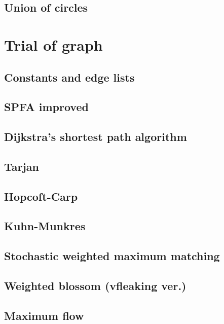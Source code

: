 \documentclass[UTF8,a4paper]{report}
\begin{document}
		\section{Union of circles}	
			
	\chapter{Trial of graph}
		\section{Constants and edge lists}
			
		\section{SPFA improved}
			
		\section{Dijkstra's shortest path algorithm}
			
		\section{Tarjan}
			
		\section{Hopcoft-Carp}
			
		\section{Kuhn-Munkres}
			
		\section{Stochastic weighted maximum matching}
			
		\section{Weighted blossom (vfleaking ver.)}	
			
		\section{Maximum flow}
			
\end{document}
